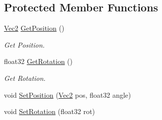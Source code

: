 \subsection*{Protected Member Functions}
\begin{DoxyCompactItemize}
\item 
\mbox{\label{class_object_aba86413210bc4e303fde370cad8ab9fe}} 
\hyperlink{struct_vec2}{Vec2} \hyperlink{class_object_aba86413210bc4e303fde370cad8ab9fe}{Get\+Position} ()
\begin{DoxyCompactList}\small\item\em Get Position. \end{DoxyCompactList}\item 
\mbox{\label{class_object_a24a504120a478e781b9a8128720f8770}} 
float32 \hyperlink{class_object_a24a504120a478e781b9a8128720f8770}{Get\+Rotation} ()
\begin{DoxyCompactList}\small\item\em Get Rotation. \end{DoxyCompactList}\item 
void \hyperlink{class_object_a988d9f95eabf06b573b55ad9bce044f6}{Set\+Position} (\hyperlink{struct_vec2}{Vec2} pos, float32 angle)
\item 
void \hyperlink{class_object_a9d94650613651d0f08c27e5ba64cef8f}{Set\+Rotation} (float32 rot)
\end{DoxyCompactItemize}
